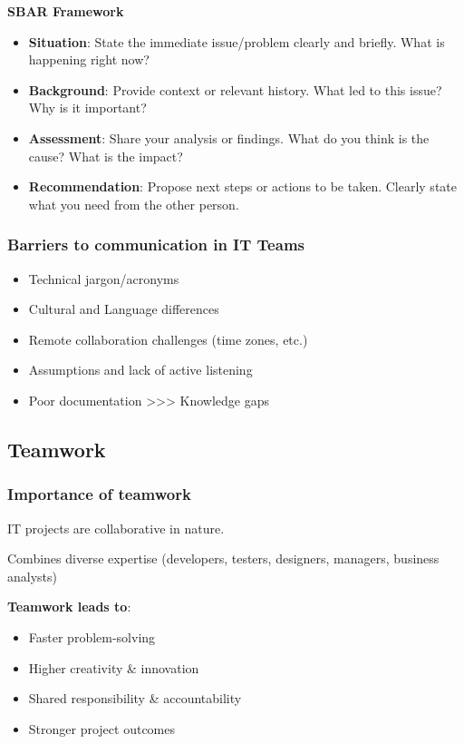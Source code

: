 \bigskip

\noindent\textbf{SBAR Framework}

\begin{itemize}
    \item \textbf{Situation}: State the immediate issue/problem clearly and briefly. What is happening right now?
    \item \textbf{Background}: Provide context or relevant history. What led to this issue? Why is it important?
    \item \textbf{Assessment}: Share your analysis or findings. What do you think is the cause? What is the impact?
    \item \textbf{Recommendation}: Propose next steps or actions to be taken. Clearly state what you need from the other person.
\end{itemize}

\subsubsection{Barriers to communication in IT Teams}

\begin{itemize}
    \item Technical jargon/acronyms
    \item Cultural and Language differences
    \item Remote collaboration challenges (time zones, etc.)
    \item Assumptions and lack of active listening
    \item Poor documentation >>> Knowledge gaps
\end{itemize}

\subsection{Teamwork}

\subsubsection{Importance of teamwork}

\indent 

IT projects are collaborative in nature.

Combines diverse expertise (developers, testers, designers, managers, 
business analysts)

\noindent\textbf{Teamwork leads to}:

\begin{itemize}
    \item Faster problem-solving
    \item Higher creativity \& innovation
    \item Shared responsibility \& accountability
    \item Stronger project outcomes
\end{itemize}

